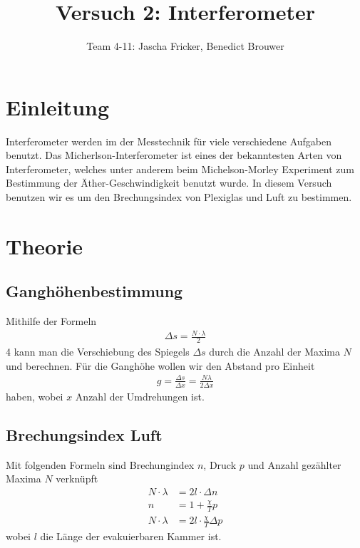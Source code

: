\documentclass[11pt, a4paper]{article}
\title{Versuch 2: Interferometer}
\author{Team 4-11: Jascha Fricker, Benedict Brouwer}
\begin{document}
    \maketitle

    \tableofcontents

    \newpage

    \section{Einleitung}

    Interferometer werden im der Messtechnik für viele verschiedene Aufgaben benutzt. Das Micherlson-Interferometer ist eines der bekanntesten Arten von Interferometer, welches unter anderem beim Michelson-Morley Experiment zum Bestimmung der Äther-Geschwindigkeit benutzt wurde. In diesem Versuch benutzen wir es um den Brechungsindex von Plexiglas und Luft zu bestimmen.

    \section{Theorie}
    \subsection{Ganghöhenbestimmung}

    Mithilfe der Formeln
    \begin{align}
        \Delta s = \frac{N \cdot \lambda}{2}
    \end{align}4
    kann man die Verschiebung des Spiegels $\Delta s$ durch die Anzahl der Maxima $N$ und berechnen. Für die Ganghöhe wollen wir den Abstand pro Einheit
    \begin{align}
        g = \frac{\Delta s}{\Delta x} = \frac{N \lambda}{2 \Delta x}
    \end{align}
    haben, wobei $x$ Anzahl der Umdrehungen ist. 

    \subsection{Brechungsindex Luft}
    Mit folgenden Formeln sind Brechungindex $n$, Druck $p$ und Anzahl gezählter Maxima $N$ verknüpft
    \begin{align}
        N \cdot \lambda &= 2 l \cdot \Delta n \\
        n &= 1 + \frac{\chi}{T} p \label{eq:luft} \\ 
        N \cdot \lambda &= 2 l \cdot \frac{\chi}{T} \Delta p
    \end{align}
    wobei $l$ die Länge der evakuierbaren Kammer ist.
\end{document}
